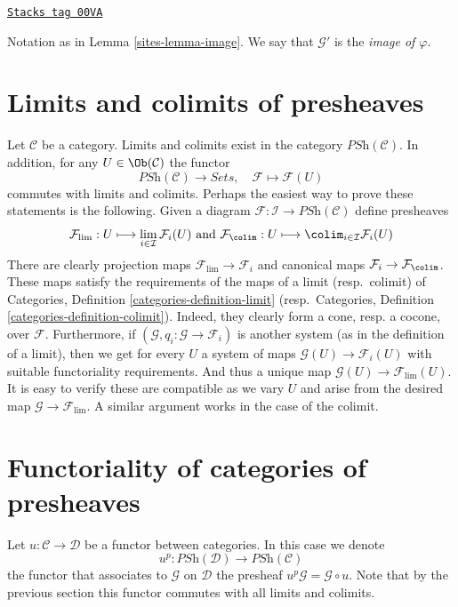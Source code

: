 \begin{definition}[Image]
\label{sites-definition-image}
\href{https://stacks.math.columbia.edu/tag/00VA}{\texttt{Stacks tag 00VA}}

Notation as in Lemma \ref{sites-lemma-image}. We
say that $\mathcal{G}'$ is the {\it image of $\varphi$}.
\end{definition}

\section{Limits and colimits of presheaves}
\label{sites-section-limits-colimits-PSh}
Let $\mathcal{C}$ be a category.
Limits and colimits exist in the category
$\textit{PSh}(\mathcal{C})$. In addition, for any
$U \in \Ob(\mathcal{C})$ the functor
$$
\textit{PSh}(\mathcal{C})
\longrightarrow
\textit{Sets}, \quad
\mathcal{F}
\longmapsto
\mathcal{F}(U)
$$
commutes with limits and colimits. Perhaps the easiest way to prove
these statements is the following. Given a diagram
$
\mathcal{F} :
\mathcal{I}
\to
\textit{PSh}(\mathcal{C})
$
define presheaves
$$
\mathcal{F}_{\lim} :
U
\longmapsto
\lim_{i \in \mathcal{I}} \mathcal{F}_i(U)
\text{  and  }
\mathcal{F}_{\colim} :
U
\longmapsto
\colim_{i \in \mathcal{I}} \mathcal{F}_i(U)
$$
There are clearly projection maps $\mathcal{F}_{\lim} \to \mathcal{F}_i$
and canonical maps $\mathcal{F}_i \to \mathcal{F}_{\colim}$. These
maps satisfy the requirements of the maps of a limit (resp.\ colimit)
of Categories, Definition \ref{categories-definition-limit}
(resp.\ Categories, Definition \ref{categories-definition-colimit}).
Indeed, they clearly form a cone, resp. a cocone, over $\mathcal{F}$.
Furthermore, if $(\mathcal{G}, q_i : \mathcal{G} \to \mathcal{F}_i)$
is another
system (as in the definition of a limit), then we get for every
$U$ a system of maps $\mathcal{G}(U) \to \mathcal{F}_i(U)$
with suitable functoriality requirements. And thus a unique
map $\mathcal{G}(U) \to \mathcal{F}_{\lim}(U)$. It is easy
to verify these are compatible  as we vary $U$ and arise from
the desired map $\mathcal{G} \to \mathcal{F}_{\lim}$.
A similar argument works in the case of the colimit.

\section{Functoriality of categories of presheaves}
\label{sites-section-functoriality-PSh}
Let $u : \mathcal{C} \to \mathcal{D}$ be a functor between categories.
In this case we denote
$$
u^p :
\textit{PSh}(\mathcal{D})
\longrightarrow
\textit{PSh}(\mathcal{C})
$$
the functor that associates to $\mathcal{G}$ on $\mathcal{D}$ the presheaf
$u^p\mathcal{G} = \mathcal{G} \circ u$. Note that by the previous section
this functor commutes with all limits and colimits.

